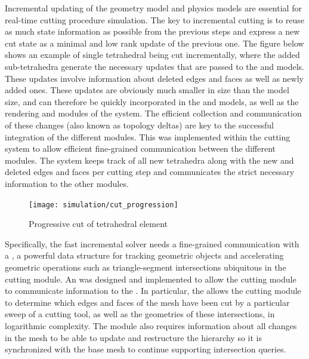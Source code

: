 Incremental updating of the  geometry model and  physics models are essential for real-time cutting procedure simulation. The key to incremental cutting is to reuse as much state information as possible from the previous steps and express a new cut state as a minimal and low rank update of the previous one. The figure below shows an example of single tetrahedral being cut incrementally, where the added sub-tetrahedra generate the necessary updates that are passed to the  and  models. These updates involve information about deleted edges and faces as well as newly added ones. These updates are obviously much smaller in size than the model size, and can therefore be quickly incorporated in the  and  models, as well as the rendering and  modules of the system. The efficient collection and communication of these changes (also known as topology deltas) are key to the successful integration of the different modules. This was implemented within the cutting system to allow efficient fine-grained communication between the different modules. The system keeps track of all new tetrahedra along with the new and deleted edges and faces per cutting step and communicates the strict necessary information to the other modules.



\begin{figure}
  \centering%
  \texttt{[image: simulation/cut\_progression]}
  \caption{Progressive cut of tetrahedral element}
  \label{fig:discontinuous_tetrahedra_solver}
\end{figure}

Specifically, the fast incremental solver needs a fine-grained communication with a , a powerful data structure for tracking geometric objects and accelerating geometric operations such as triangle-segment intersections ubiquitous in the cutting module. An  was designed and implemented to allow the cutting module to communicate information to the . In particular, the   allows the cutting module to determine which edges and faces of the mesh have been cut by a particular sweep of a cutting tool, as well as the geometries of these intersections, in logarithmic complexity. The  module also requires information about all changes in the mesh to be able to update and restructure the hierarchy so it is synchronized with the base mesh to continue supporting intersection queries.


